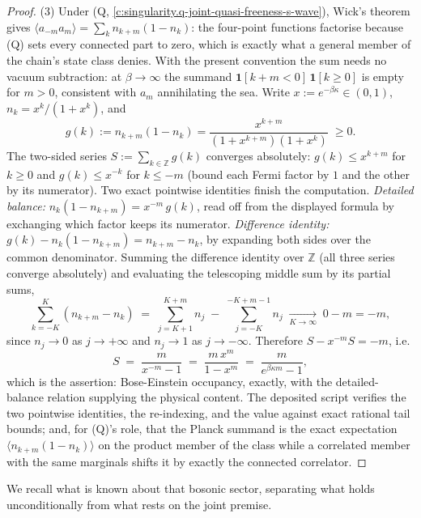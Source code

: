 \documentclass[11pt]{article}
\theoremstyle{definition}
\theoremstyle{plain}
\begin{document}
\begin{proof}
(3) Under (Q, \ref{c:singularity.q-joint-quasi-freeness-s-wave}), Wick's theorem gives $\langle a_{-m} a_m\rangle = \sum_{k} n_{k+m}(1 - n_k)$: the four-point functions factorise because (Q) sets every connected part to zero, which is exactly what a general member of the chain's state class denies. With the present convention the sum needs no vacuum subtraction: at $\beta \to \infty$ the summand $\mathbf{1}[k + m < 0]\,\mathbf{1}[k \geq 0]$ is empty for $m > 0$, consistent with $a_m$ annihilating the sea. Write $x := e^{-\beta\kappa} \in (0,1)$, $n_k = x^k/(1 + x^k)$, and
\[
g(k) := n_{k+m}(1 - n_k) = \frac{x^{k+m}}{(1 + x^{k+m})(1 + x^k)} \;\geq 0.
\]
The two-sided series $S := \sum_{k \in \mathbb{Z}} g(k)$ converges absolutely: $g(k) \leq x^{k+m}$ for $k \geq 0$ and $g(k) \leq x^{-k}$ for $k \leq -m$ (bound each Fermi factor by $1$ and the other by its numerator). Two exact pointwise identities finish the computation. \emph{Detailed balance:} $n_k(1 - n_{k+m}) = x^{-m}\, g(k)$, read off from the displayed formula by exchanging which factor keeps its numerator. \emph{Difference identity:} $g(k) - n_k(1 - n_{k+m}) = n_{k+m} - n_k$, by expanding both sides over the common denominator. Summing the difference identity over $\mathbb{Z}$ (all three series converge absolutely) and evaluating the telescoping middle sum by its partial sums,
\[
\sum_{k=-K}^{K} (n_{k+m} - n_k) \;=\; \sum_{j=K+1}^{K+m} n_j \;-\; \sum_{j=-K}^{-K+m-1} n_j \;\xrightarrow[K \to \infty]{}\; 0 - m = -m ,
\]
since $n_j \to 0$ as $j \to +\infty$ and $n_j \to 1$ as $j \to -\infty$. Therefore $S - x^{-m} S = -m$, i.e.
\[
S \;=\; \frac{m}{x^{-m} - 1} \;=\; \frac{m\,x^m}{1 - x^m} \;=\; \frac{m}{e^{\beta\kappa m} - 1} ,
\]
which is the assertion: Bose-Einstein occupancy, exactly, with the detailed-balance relation supplying the physical content. The deposited script verifies the two pointwise identities, the re-indexing, and the value against exact rational tail bounds; and, for (Q)'s role, that the Planck summand is the exact expectation $\langle n_{k+m}(1 - n_k)\rangle$ on the product member of the class while a correlated member with the same marginals shifts it by exactly the connected correlator.

\end{proof}

We recall what is known about that bosonic sector, separating what holds unconditionally from what rests on the joint premise.
\end{document}
